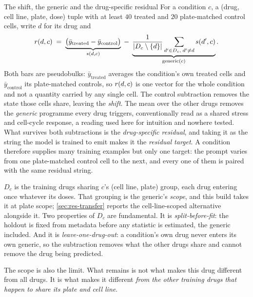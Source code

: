 \begin{defn}{The shift, the generic and the drug-specific residual}
For a condition $c$, a (drug, cell line, plate, dose) tuple with at least $40$
treated and $20$ plate-matched control cells, write $d$ for its drug and
\begin{equation}
 r(d,c) \;=\;
 \underbrace{\big(\bar{y}_{\textrm{treated}} - \bar{y}_{\textrm{control}}\big)}_{s(d,c)}
 \;-\;
 \underbrace{\frac{1}{|D_c \setminus \{d\}|}
   \sum_{d' \in D_c,\; d' \neq d} s(d',c)}_{\textrm{generic}(c)} .
\end{equation}
Both bars are pseudobulks: $\bar{y}_{\textrm{treated}}$ averages the condition's
own treated cells and $\bar{y}_{\textrm{control}}$ its plate-matched controls, so
$r(d,c)$ is one vector for the whole condition and not a quantity carried by
any single cell. The control subtraction removes the state those cells share,
leaving the \emph{shift}. The mean over the other drugs removes the \emph{generic}
programme every drug triggers, conventionally read as a shared stress and
cell-cycle response, a reading used here for intuition and nowhere tested. What
survives both subtractions is the \emph{drug-specific residual}, and taking it as
the string the model is trained to emit makes it the \emph{residual target}. A
condition therefore supplies many training examples but only one target: the
prompt varies from one plate-matched control cell to the next, and every one of
them is paired with the same residual string.

\smallskip
$D_c$ is the training drugs sharing $c$'s (cell line, plate) group, each drug
entering once whatever its doses. That grouping is the generic's \emph{scope},
and this build takes it at plate scope; \cref{sec:res-transfer} reports the
cell-line-scoped alternative alongside it. Two properties of $D_c$ are fundamental. It is \emph{split-before-fit}: the holdout is fixed from metadata
before any statistic is estimated, the generic included. And it is
\emph{leave-one-drug-out}: a condition's own drug never enters its own generic,
so the subtraction removes what the other drugs share and cannot remove the drug
being predicted.

\smallskip
The scope is also the limit. What remains is not what makes this drug different
from all drugs. It is what makes it different \emph{from the other training
drugs that happen to share its plate and cell line}.
\end{defn}
